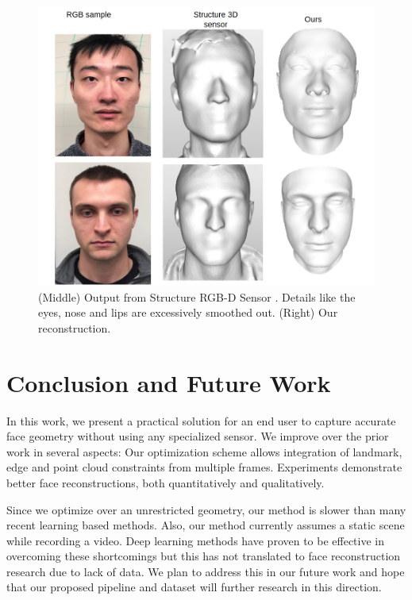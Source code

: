 \documentclass[10pt,twocolumn,letterpaper]{article}
\begin{document}
\begin{figure}
\begin{center}
   \includegraphics[width=0.6\linewidth]{images/struc_3d_comp.png}
\end{center}
   \caption{(Middle) Output from Structure RGB-D Sensor \cite{structure2019}. Details like the eyes, nose and lips are excessively smoothed out. (Right) Our reconstruction.}
\label{fig:long}
\label{fig:onecol}
\end{figure}



\section{Conclusion and Future Work}
In this work, we present a practical solution for an end user to capture accurate face geometry without using any specialized sensor. We improve over the prior work in several aspects: Our optimization scheme allows integration of landmark, edge and point cloud constraints from multiple frames. Experiments demonstrate better face reconstructions, both quantitatively and qualitatively. 

Since we optimize over an unrestricted geometry, our method is slower than many recent learning based methods. Also, our method currently assumes a static scene while recording a video. Deep learning methods have proven to be effective in overcoming these shortcomings but this has not translated to face reconstruction research due to lack of data. We plan to address this in our future work and hope that our proposed pipeline and dataset will further research in this direction.    

\newpage
\newpage
{\small


}
\end{document}
